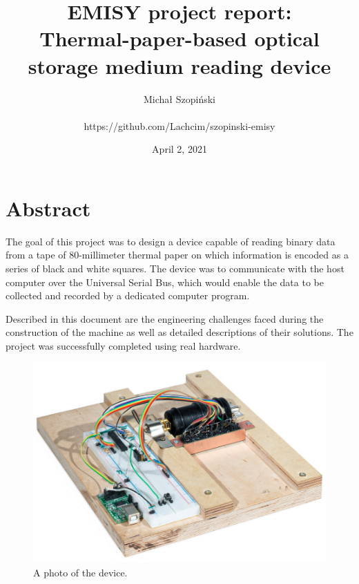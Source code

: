 \documentclass{article}
\begin{document}
	\title{EMISY project report:\\Thermal-paper-based optical storage medium
	reading device}
	\author{Michał Szopiński\\\\
	https://github.com/Lachcim/szopinski-emisy}
	\date{April 2, 2021}
	\maketitle
	
	\setcounter{section}{-1}
	\section{Abstract}
	
	The goal of this project was to design a device capable of reading binary
	data from a tape of 80-millimeter thermal paper on which information is
	encoded as a series of black and white squares. The device was to
	communicate with the host computer over the Universal Serial Bus, which
	would enable the data to be collected and recorded by a dedicated computer
	program.
	
	Described in this document are the engineering challenges faced during the
	construction of the machine as well as detailed descriptions of their
	solutions. The project was successfully completed using real hardware.
	
	\newpage
	
	\hspace{0cm}
	\vfill
	\begin{figure}[h]		
		\includegraphics[width=\linewidth]{img/device}
		\caption{A photo of the device.}
	\end{figure}
	\vfill
	\hspace{0cm}
	
\end{document}
